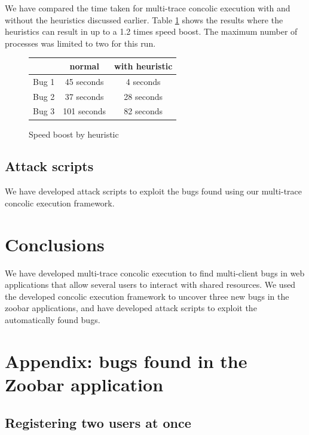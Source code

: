 \documentclass{llncs}
\begin{document}
We have compared the time taken for multi-trace concolic execution
with and without the heuristics discussed earlier. Table
\ref{fig:speed} shows the results where the heuristics can result in
up to a 1.2 times speed boost. The maximum number of processes was
limited to two for this run.

\begin{figure}
  \begin{center}
    \begin{tabular}{l|c|c}
      \hline
      & normal & with heuristic \\
      \hline
      Bug 1 & 45 seconds & 4 seconds \\
      Bug 2 & 37 seconds & 28 seconds \\
      Bug 3 & 101 seconds & 82 seconds \\
      \hline
    \end{tabular}
  \end{center}
  \caption{Speed boost by heuristic}
  \label{fig:speed}
\end{figure}


\subsection{Attack scripts}

We have developed attack scripts to exploit the bugs found using our
multi-trace concolic execution framework.

\section{Conclusions}

We have developed multi-trace concolic execution to find multi-client
bugs in web applications that allow several users to interact with
shared resources. We used the developed concolic execution framework
to uncover three new bugs in the zoobar applications, and have
developed attack scripts to exploit the automatically found bugs.

\newpage
\appendix

\section{Appendix: bugs found in the Zoobar application}
\label{app:a}

\subsection{Registering two users at once}
\end{document}
